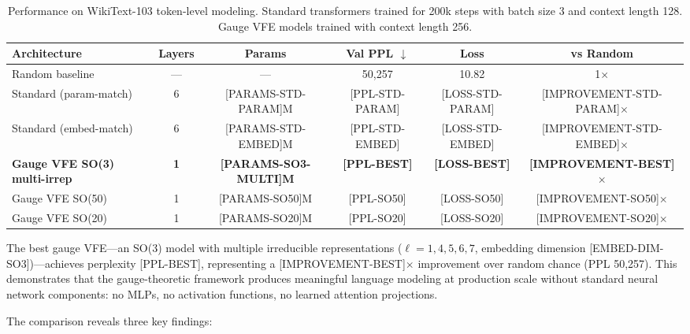 \documentclass[twoside,11pt]{article}
\begin{document}
\begin{table}[t]
\centering
\small
\caption{Performance on WikiText-103 token-level modeling. Standard transformers trained for 200k steps with batch size 3 and context length 128. Gauge VFE models trained with context length 256.}
\label{tab:main_results}
\begin{tabular}{lccccc}
\toprule
\textbf{Architecture} & \textbf{Layers} & \textbf{Params} & \textbf{Val PPL} $\downarrow$ & \textbf{Loss} & \textbf{vs Random} \\
\midrule
Random baseline & --- & --- & 50,257 & 10.82 & 1$\times$ \\
\midrule
Standard (param-match) & 6 & [PARAMS-STD-PARAM]M & [PPL-STD-PARAM] & [LOSS-STD-PARAM] & [IMPROVEMENT-STD-PARAM]$\times$ \\
Standard (embed-match) & 6 & [PARAMS-STD-EMBED]M & [PPL-STD-EMBED] & [LOSS-STD-EMBED] & [IMPROVEMENT-STD-EMBED]$\times$ \\
\midrule
\textbf{Gauge VFE SO(3) multi-irrep} & \textbf{1} & \textbf{[PARAMS-SO3-MULTI]M} & \textbf{[PPL-BEST]} & \textbf{[LOSS-BEST]} & \textbf{[IMPROVEMENT-BEST]$\times$} \\
Gauge VFE SO(50) & 1 & [PARAMS-SO50]M & [PPL-SO50] & [LOSS-SO50] & [IMPROVEMENT-SO50]$\times$ \\
Gauge VFE SO(20) & 1 & [PARAMS-SO20]M & [PPL-SO20] & [LOSS-SO20] & [IMPROVEMENT-SO20]$\times$ \\
\bottomrule
\end{tabular}
\end{table}

The best gauge VFE---an SO(3) model with multiple irreducible representations ($\ell=1,4,5,6,7$, embedding dimension [EMBED-DIM-SO3])---achieves perplexity [PPL-BEST], representing a [IMPROVEMENT-BEST]$\times$ improvement over random chance (PPL 50,257). This demonstrates that the gauge-theoretic framework produces meaningful language modeling at production scale without standard neural network components: no MLPs, no activation functions, no learned attention projections.

The comparison reveals three key findings:
\end{document}
